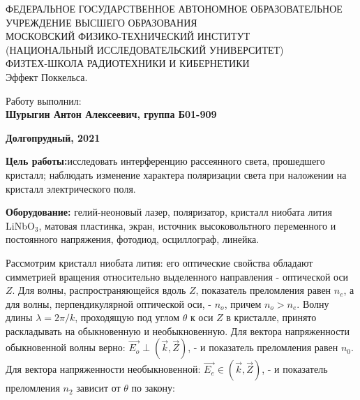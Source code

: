 \documentclass[15pt,a5paper,reqno]{article}
\begin{document}
\begin{center}
  {\small ФЕДЕРАЛЬНОЕ ГОСУДАРСТВЕННОЕ АВТОНОМНОЕ ОБРАЗОВАТЕЛЬНОЕ\\ УЧРЕЖДЕНИЕ ВЫСШЕГО ОБРАЗОВАНИЯ\\ МОСКОВСКИЙ ФИЗИКО-ТЕХНИЧЕСКИЙ ИНСТИТУТ\\ (НАЦИОНАЛЬНЫЙ ИССЛЕДОВАТЕЛЬСКИЙ УНИВЕРСИТЕТ)\\ ФИЗТЕХ-ШКОЛА РАДИОТЕХНИКИ И КИБЕРНЕТИКИ}\\
  \hfill \break
  \hfill \break
  \hfill \break
  \Huge{Эффект Поккельса.}\\
\end{center}

\hfill \break
\hfill \break
\hfill \break
\hfill \break
\hfill \break
\hfill \break

\begin{flushright}
  \normalsize{Работу выполнил:}\\
  \normalsize{\textbf{Шурыгин Антон Алексеевич, группа Б01-909}}\\
\end{flushright}

\begin{center}
  \normalsize{\textbf{Долгопрудный, 2021}}
\end{center}


\thispagestyle{empty} %


\newpage
\thispagestyle{plain}
\tableofcontents
\thispagestyle{plain}
\newpage




	\textbf{Цель работы:}исследовать интерференцию рассеянного света, прошедшего кристалл; наблюдать изменение характера поляризации света при наложении на кристалл электрического поля.
	
	\textbf{Оборудование:} гелий-неоновый лазер, поляризатор, кристалл ниобата лития LiNbO$_3$, матовая пластинка, экран, источник высоковольтного переменного и постоянного напряжения, фотодиод, осциллограф, линейка.
	
	Рассмотрим кристалл ниобата лития: его оптические свойства обладают симметрией вращения относительно выделенного направления - оптической оси $Z$. Для волны, распространяющейся вдоль $Z$, показатель преломления равен $n_e$, а для волны, перпендикулярной оптической оси, - $n_o$, причем $n_o > n_e$. Волну длины $\lambda = 2\pi/k$, проходящую под углом $\theta$ к оси $Z$ в кристалле, принято раскладывать на обыкновенную и необыкновенную. Для вектора напряженности обыкновенной волны верно: $\overrightarrow{E_o} \perp (\overrightarrow{k}, \overrightarrow{Z})$, - и показатель преломления равен $n_0$. Для вектора напряженности необыкновенной: $\overrightarrow{E_e} \in (\overrightarrow{k}, \overrightarrow{Z})$, - и показатель преломления $n_2$ зависит от $\theta$ по закону:
	
\end{document}
